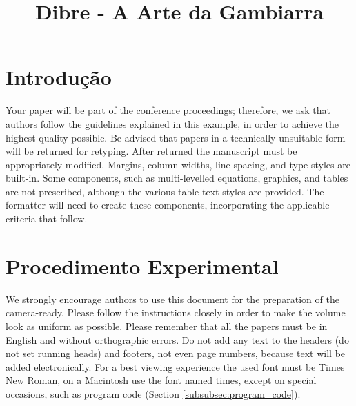 \documentclass[a4paper,twoside]{article}
\begin{document}
\title{Dibre - A Arte da Gambiarra}

\author{
}



\onecolumn \maketitle \normalsize \vfill

\section*{Introdução}
\label{sec:introduction}
Your paper will be part of the conference proceedings; therefore, we ask that authors follow the guidelines explained in this example, in order to achieve the highest quality possible. Be advised that papers in a technically unsuitable form will be returned for retyping. After returned the manuscript must be appropriately modified. 
Margins, column widths, line spacing, and type styles are built-in. Some components, such as multi-levelled equations, graphics, and tables are not prescribed, although the various table text styles are provided. The formatter will need to create these components, incorporating the applicable criteria that follow.

\section*{Procedimento Experimental}

We strongly encourage authors to use this document for the preparation of the camera-ready. Please follow the instructions closely in order to make the volume look as uniform as possible.
Please remember that all the papers must be in English and without orthographic errors.
Do not add any text to the headers (do not set running heads) and footers, not even page numbers, because text will be added electronically.
For a best viewing experience the used font must be Times New Roman, on a Macintosh use the font named times, except on special occasions, such as program code (Section \ref{subsubsec:program_code}).
\end{document}
